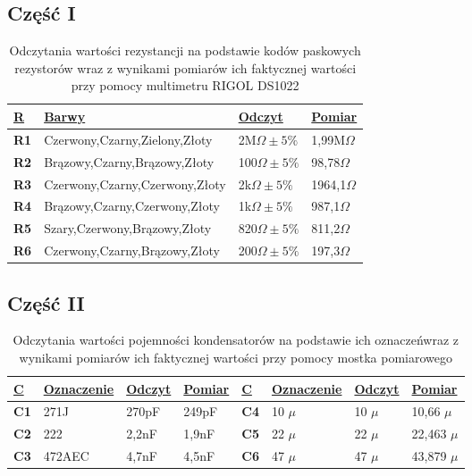 \documentclass[polish,polish,a4paper]{article}
\begin{document}
\subsection{Część I}
\begin{table}[!h]
\centering
\begin{tabular}{|y|l|l|l|}
\hline
{}
\textbf{\underline{R}} & \textbf{\underline{Barwy}} & \textbf{\underline{Odczyt}} &\textbf{\underline{Pomiar}} \\
\hline
\textbf{R1} & Czerwony,Czarny,Zielony,Złoty & 2M$\Omega \pm 5\%$ &
1,99M$\Omega$
\\
\hline
\textbf{R2} & Brązowy,Czarny,Brązowy,Złoty & 100$\Omega \pm 5\%$ &
98,78$\Omega$
\\
\hline
\textbf{R3} & Czerwony,Czarny,Czerwony,Złoty & 2k$\Omega \pm 5\%$ &
1964,1$\Omega$
\\
\hline
\textbf{R4} & Brązowy,Czarny,Czerwony,Złoty & 1k$\Omega \pm 5\%$ &
987,1$\Omega$
\\
\hline
\textbf{R5} & Szary,Czerwony,Brązowy,Złoty & 820$\Omega \pm 5\%$ &
811,2$\Omega$
\\
\hline
\textbf{R6} & Czerwony,Czarny,Brązowy,Złoty & 200$\Omega \pm 5\%$ &
197,3$\Omega$
\\
\hline

\end{tabular}
\caption{Odczytania wartości rezystancji na podstawie kodów paskowych rezystorów wraz z wynikami pomiarów ich faktycznej wartości przy pomocy multimetru RIGOL DS1022}
\end{table}

\subsection{Część II}
\begin{table}[!h]
\centering
\begin{tabular}{|y|l|l|l|y|l|l|l|}
\hline
{}
\textbf{\underline{C}} & \textbf{\underline{Oznaczenie}} & \textbf{\underline{Odczyt}} & \textbf{\underline{Pomiar}} & \textbf{\underline{C}} & \textbf{\underline{Oznaczenie}} & \textbf{\underline{Odczyt}} & \textbf{\underline{Pomiar}} \\
\hline
\textbf{C1} & 271J & 270pF & 249pF &
\textbf{C4} & 10 $\mu$ & 10 $\mu$ & 10,66 $\mu$ \\
\hline
\textbf{C2} & 222 & 2,2nF & 1,9nF &
\textbf{C5} & 22 $\mu$ & 22 $\mu$ & 22,463 $\mu$ \\
\hline
\textbf{C3} & 472AEC & 4,7nF & 4,5nF &
\textbf{C6} & 47 $\mu$ & 47 $\mu$ & 43,879 $\mu$ \\
\hline

\end{tabular}
\caption{Odczytania wartości pojemności kondensatorów na podstawie ich oznaczeńwraz z wynikami pomiarów ich faktycznej wartości przy pomocy mostka pomiarowego}
\end{table}
\end{document}
